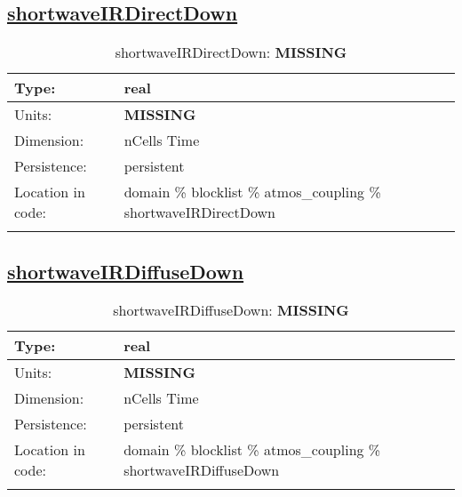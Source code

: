 \subsection[shortwaveIRDirectDown]{\hyperref[sec:var_tab_atmos_coupling]{shortwaveIRDirectDown}}
\label{subsec:var_sec_atmos_coupling_shortwaveIRDirectDown}
\begin{center}
\begin{longtable}{| p{2.0in} | p{4.0in} |}
        \hline 
        Type: & real \\
        \hline 
        Units: & {\bf \color{red} MISSING} \\
        \hline 
        Dimension: & nCells Time \\
        \hline 
        Persistence: & persistent \\
        \hline 
         Location in code: & domain \% blocklist \% atmos\_coupling \% shortwaveIRDirectDown \\
         \hline 
    \caption{shortwaveIRDirectDown: {\bf \color{red} MISSING}}
\end{longtable}
\end{center}
\subsection[shortwaveIRDiffuseDown]{\hyperref[sec:var_tab_atmos_coupling]{shortwaveIRDiffuseDown}}
\label{subsec:var_sec_atmos_coupling_shortwaveIRDiffuseDown}
\begin{center}
\begin{longtable}{| p{2.0in} | p{4.0in} |}
        \hline 
        Type: & real \\
        \hline 
        Units: & {\bf \color{red} MISSING} \\
        \hline 
        Dimension: & nCells Time \\
        \hline 
        Persistence: & persistent \\
        \hline 
         Location in code: & domain \% blocklist \% atmos\_coupling \% shortwaveIRDiffuseDown \\
         \hline 
    \caption{shortwaveIRDiffuseDown: {\bf \color{red} MISSING}}
\end{longtable}
\end{center}
